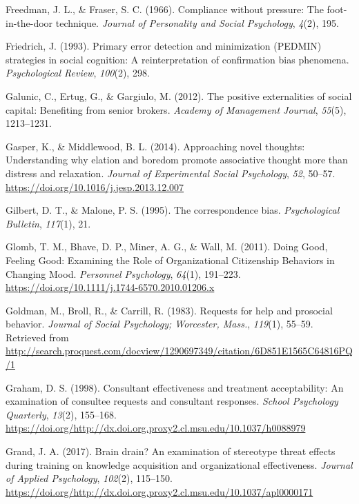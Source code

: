 \documentclass[english,,man]{apa6}
\begin{document}
\leavevmode\hypertarget{ref-freedman_compliance_1966}{}%
Freedman, J. L., \& Fraser, S. C. (1966). Compliance without pressure: The foot-in-the-door technique. \emph{Journal of Personality and Social Psychology}, \emph{4}(2), 195.

\leavevmode\hypertarget{ref-friedrich_primary_1993}{}%
Friedrich, J. (1993). Primary error detection and minimization (PEDMIN) strategies in social cognition: A reinterpretation of confirmation bias phenomena. \emph{Psychological Review}, \emph{100}(2), 298.

\leavevmode\hypertarget{ref-galunic_positive_2012}{}%
Galunic, C., Ertug, G., \& Gargiulo, M. (2012). The positive externalities of social capital: Benefiting from senior brokers. \emph{Academy of Management Journal}, \emph{55}(5), 1213--1231.

\leavevmode\hypertarget{ref-gasper_approaching_2014}{}%
Gasper, K., \& Middlewood, B. L. (2014). Approaching novel thoughts: Understanding why elation and boredom promote associative thought more than distress and relaxation. \emph{Journal of Experimental Social Psychology}, \emph{52}, 50--57. \url{https://doi.org/10.1016/j.jesp.2013.12.007}

\leavevmode\hypertarget{ref-gilbert_correspondence_1995}{}%
Gilbert, D. T., \& Malone, P. S. (1995). The correspondence bias. \emph{Psychological Bulletin}, \emph{117}(1), 21.

\leavevmode\hypertarget{ref-glomb_doing_2011}{}%
Glomb, T. M., Bhave, D. P., Miner, A. G., \& Wall, M. (2011). Doing Good, Feeling Good: Examining the Role of Organizational Citizenship Behaviors in Changing Mood. \emph{Personnel Psychology}, \emph{64}(1), 191--223. \url{https://doi.org/10.1111/j.1744-6570.2010.01206.x}

\leavevmode\hypertarget{ref-goldman_requests_1983}{}%
Goldman, M., Broll, R., \& Carrill, R. (1983). Requests for help and prosocial behavior. \emph{Journal of Social Psychology; Worcester, Mass.}, \emph{119}(1), 55--59. Retrieved from \url{http://search.proquest.com/docview/1290697349/citation/6D851E1565C64816PQ/1}

\leavevmode\hypertarget{ref-graham_consultant_1998}{}%
Graham, D. S. (1998). Consultant effectiveness and treatment acceptability: An examination of consultee requests and consultant responses. \emph{School Psychology Quarterly}, \emph{13}(2), 155--168. \url{https://doi.org/http://dx.doi.org.proxy2.cl.msu.edu/10.1037/h0088979}

\leavevmode\hypertarget{ref-grand_brain_2017}{}%
Grand, J. A. (2017). Brain drain? An examination of stereotype threat effects during training on knowledge acquisition and organizational effectiveness. \emph{Journal of Applied Psychology}, \emph{102}(2), 115--150. \url{https://doi.org/http://dx.doi.org.proxy2.cl.msu.edu/10.1037/apl0000171}
\end{document}
